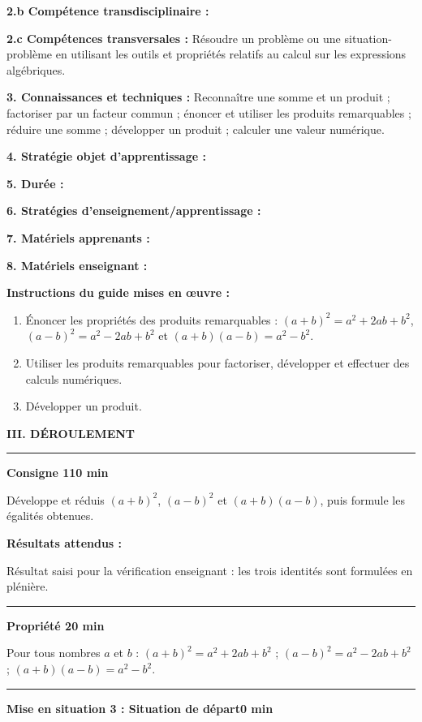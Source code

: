 \documentclass[10pt,a4paper]{article}
\begin{document}
\textbf{2.b Compétence transdisciplinaire :} \par
\textbf{2.c Compétences transversales :} Résoudre un problème ou une situation-problème en utilisant les outils et propriétés relatifs au calcul sur les expressions algébriques.\par
\textbf{3. Connaissances et techniques :} Reconnaître une somme et un produit ; factoriser par un facteur commun ; énoncer et utiliser les produits remarquables ; réduire une somme ; développer un produit ; calculer une valeur numérique.\par
\textbf{4. Stratégie objet d'apprentissage :} \par
\textbf{5. Durée :} \par
\textbf{6. Stratégies d'enseignement/apprentissage :} \par
\textbf{7. Matériels apprenants :} \par
\textbf{8. Matériels enseignant :} \par
\textbf{Instructions du guide mises en œuvre :}\begin{enumerate}
\item Énoncer les propriétés des produits remarquables : $(a+b)^2=a^2+2ab+b^2$, $(a-b)^2=a^2-2ab+b^2$ et $(a+b)(a-b)=a^2-b^2$.
\item Utiliser les produits remarquables pour factoriser, développer et effectuer des calculs numériques.
\item Développer un produit.
\end{enumerate}
\begin{center}\textbf{III. DÉROULEMENT}\end{center}
\par\smallskip\hrule\smallskip
\textbf{Consigne 1}\hfill \textbf{10 min}\par
Développe et réduis $(a+b)^2$, $(a-b)^2$ et $(a+b)(a-b)$, puis formule les égalités obtenues.\par
\textbf{Résultats attendus :}\par Résultat saisi pour la vérification enseignant : les trois identités sont formulées en plénière.\par
\par\smallskip\hrule\smallskip
\textbf{Propriété 2}\hfill \textbf{0 min}\par
Pour tous nombres $a$ et $b$ : $(a+b)^2=a^2+2ab+b^2$ ; $(a-b)^2=a^2-2ab+b^2$ ; $(a+b)(a-b)=a^2-b^2$.\par
\par\smallskip\hrule\smallskip
\textbf{Mise en situation 3 : Situation de départ}\hfill \textbf{0 min}\par
\end{document}
